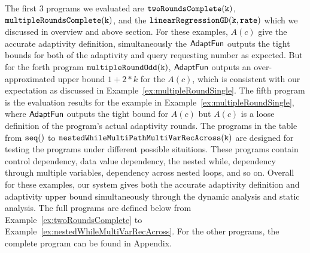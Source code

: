 The first 3 programs we evaluated are $ \mathtt{twoRoundsComplete(k)}$, $ \mathtt{multipleRoundsComplete(k)}$, 
and the $\mathtt{linearRegressionGD(k, rate)}$ which we discussed in overview and above section.
For these examples, $A(c)$ 
give the accurate adaptivity definition, 
simultaneously the $\textsf{AdaptFun}$ outputs the tight bounds for both of the adaptivity and query requesting number as expected.
But for the forth program $\mathtt{multipleRoundOdd(k)}$, $\textsf{AdaptFun}$ outputs an over-approximated upper bound $1 + 2*k$ for the $A(c)$, 
which is consistent with our expectation as discussed in Example~\ref{ex:multipleRoundSingle}. 
The fifth program is the evaluation results for the example in Example~\ref{ex:multipleRoundSingle}, where $\textsf{AdaptFun}$ outputs
the tight bound for $A(c)$ but $A(c)$ is a loose definition of the program's actual adaptivity rounds.
%
The programs in the table from  $\mathtt{seq()}$ to $ \mathtt{nestedWhileMultiPathMultiVarRecAcross(k)}$ are 
designed for testing the programs under different possible situitions.
These programs contain control dependency, data value dependency,
the nested while, dependency through multiple variables, dependency across nested loops, and so on. 
Overall for these examples, our system gives both the accurate adaptivity definition and 
adaptivity upper bound simultaneously through the dynamic analysis and 
static analysis.
The full programs are defined below from Example~\ref{ex:twoRoundsComplete} to Example~\ref{ex:nestedWhileMultiVarRecAcross}.
%
For the other programs, the complete program can be found in Appendix.

